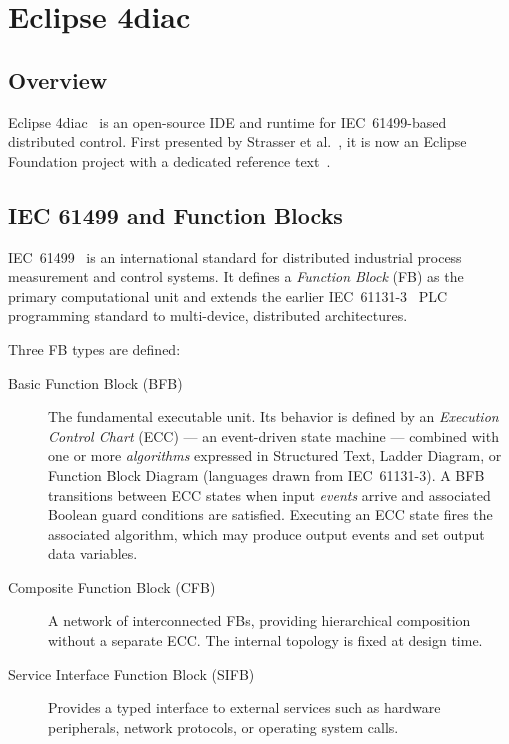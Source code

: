 \section{Eclipse 4diac}
\label{sec:fordiac}

\subsection{Overview}

Eclipse 4diac~\cite{Eclipse4diac} is an open-source IDE and runtime for IEC~61499-based distributed control. First presented by Strasser et al.~\cite{Strasser2008}, it is now an Eclipse Foundation project with a dedicated reference text~\cite{Zoitl2017}.

\subsection{IEC 61499 and Function Blocks}

IEC~61499~\cite{IEC61499} is an international standard for distributed industrial process measurement and control systems. It defines a \textit{Function Block} (FB) as the primary computational unit and extends the earlier IEC~61131-3~\cite{IEC61131} PLC programming standard to multi-device, distributed architectures.

Three FB types are defined:

\begin{description}
  \item[Basic Function Block (BFB)] The fundamental executable unit. Its behavior is defined by an \textit{Execution Control Chart} (ECC) --- an event-driven state machine --- combined with one or more \textit{algorithms} expressed in Structured Text, Ladder Diagram, or Function Block Diagram (languages drawn from IEC~61131-3). A BFB transitions between ECC states when input \textit{events} arrive and associated Boolean guard conditions are satisfied. Executing an ECC state fires the associated algorithm, which may produce output events and set output data variables.
  \item[Composite Function Block (CFB)] A network of interconnected FBs, providing hierarchical composition without a separate ECC. The internal topology is fixed at design time.
  \item[Service Interface Function Block (SIFB)] Provides a typed interface to external services such as hardware peripherals, network protocols, or operating system calls.
\end{description}

